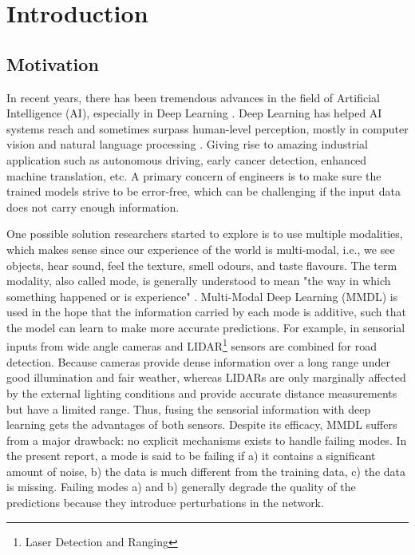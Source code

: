 
\chapter{Introduction} 
\label{chapter-introduction} 


\section{Motivation}

In recent years, there has been tremendous advances in the field of Artificial Intelligence (AI), especially in Deep Learning \citep{lecun-dl, deeplearning-overview}. Deep Learning has helped AI systems reach and sometimes surpass human-level perception, mostly in computer vision \citep{image-recognition} and natural language processing \citep{machine-translation}. Giving rise to amazing industrial application such as autonomous driving, early cancer detection, enhanced machine translation, etc. A primary concern of engineers is to make sure the trained models strive to be error-free, which can be challenging if the input data does not carry enough information.

One possible solution researchers started to explore is to use multiple modalities, which makes sense since our experience of the world is multi-modal, i.e., we see objects, hear sound, feel the texture, smell odours, and taste flavours. The term modality, also called mode, is generally understood to mean "the way in which something happened or is experience" \citep{taxomany-multimodal}. Multi-Modal Deep Learning (MMDL) is used in the hope that the information carried by each mode is additive, such that the model can learn to make more accurate predictions. For example, in \citep{lidar-camera} sensorial inputs from wide angle cameras and LIDAR\footnote{Laser Detection and Ranging} sensors are combined for road detection. Because cameras provide dense information over a long range under good illumination and fair weather, whereas LIDARs are only marginally affected by the external lighting conditions and provide accurate distance measurements but have a limited range. Thus, fusing the sensorial information with deep learning gets the advantages of both sensors. Despite its efficacy, MMDL suffers from a major drawback: no explicit mechanisms exists to handle failing modes. In the present report, a mode is said to be failing if a) it contains a significant amount of noise, b) the data is much different from the training data, c) the data is missing. Failing modes a) and b) generally degrade the quality of the predictions because they introduce perturbations in the network.

